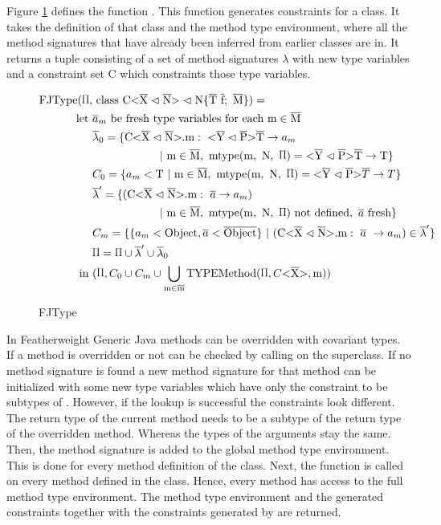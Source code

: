 Figure \ref{fjtype} defines the function . This function generates constraints for a class. It takes the definition of that class and the method type environment, where all the method signatures that have already been inferred from earlier classes are in.
It returns a tuple consisting of a set of method signatures $\lambda$ with new type variables and a constraint set C which constraints those type variables.

\begin{figure}[tp]
    \begin{align*}
        \text{FJType}(\sprod{0.7}, & \ \classheader \{ \ot{T} \ \ot{f}; \ \ot{M} \}) = \\
        \text{let} \ & \overline{a}_m \ \text{be fresh type variables for each m} \in \ot{M} \\
        & \overline{\lambda}_0 = \{\cm : \ \yp \ot{T} \to a_m \\
        & \quad \quad \quad \quad \quad \quad | \ \text{m} \in \ot{M}, \ \mtype = \yp \ot{T} \to \text{T} \}\\
        & C_0 = \{ a_m < \text{T} \ | \ \text{m} \in \ot{M}, \ \mtype = \yp \oto{T} \}\\
        & \overline{\lambda}' = \{ ( \cm : \ \overline{a} \to a_m ) \\
        & \quad \quad \quad \quad \quad \quad | \ \text{m} \in \ot{M}, \ \mtype \ \text{not defined}, \ \fresh{\overline{a}} \}\\
        & C_m = \{\{ a_m < \text{Object}, \overline{a} < \ot{Object} \} \ | \ ( \cm : \ \overline{a} \ \to a_m) \in \overline{\lambda}' \} \\
        & \sprod{0.7} = \sprod{0.7} \cup \overline{\lambda}' \cup \overline{\lambda}_0\\
    \text{in} \ &(\sprod{0.7}, C_0 \cup C_m \cup \bigcup_{ \text{m} \in \ot{m} } \text{TYPEMethod}(\sprod{0.7}, C \vv{\ot{X}}, \text{m}))\\
    \end{align*}
    \caption{FJType}
    \label{fjtype}
\end{figure}

In Featherweight Generic Java methods can be overridden with covariant types. If a method is overridden or not can be checked by calling  on the superclass.
If no method signature is found a new method signature for that method can be initialized with some new type variables which have only the constraint to be subtypes of .
However, if the  lookup is successful the constraints look different. The return type of the current method needs to be a subtype of the return type of the overridden method.
Whereas the types of the arguments stay the same. Then, the method signature is added to the global method type environment.
This is done for every method definition of the class. Next, the  function is called on every method defined in the class. Hence, every method has access to the full method type environment.
The method type environment and the generated constraints together with the constraints generated by  are returned.

